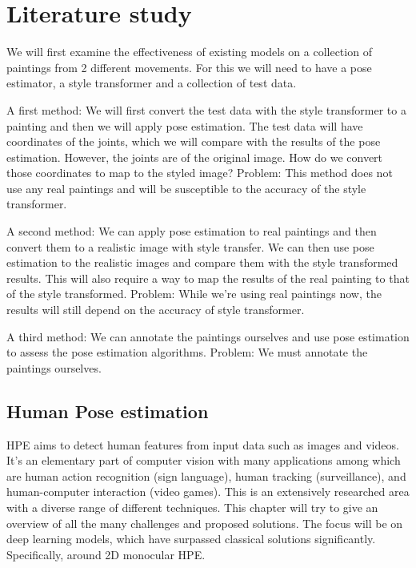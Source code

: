 \chapter{Literature study}
\label{chap:rel_work}

We will first examine the effectiveness of existing models on a collection of paintings from 2 different movements.
For this we will need to have a pose estimator, a style transformer and a collection of test data. 

A first method: We will first convert the test data with the style transformer to a painting and then we will apply pose estimation.
The test data will have coordinates of the joints, which we will compare with the results of the pose estimation.
However, the joints are of the original image. How do we convert those coordinates to map to the styled image? 
Problem: This method does not use any real paintings and will be susceptible to the accuracy of the style transformer.  

A second method: We can apply pose estimation to real paintings and then convert them to a realistic image with style transfer.
We can then use pose estimation to the realistic images and compare them with the style transformed results.
This will also require a way to map the results of the real painting to that of the style transformed. 
Problem: While we’re using real paintings now, the results will still depend on the accuracy of style transformer. 

A third method: We can annotate the paintings ourselves and use pose estimation to assess the pose estimation algorithms. 
Problem: We must annotate the paintings ourselves. 

\section{Human Pose estimation}
\label{sec:hpe}

\gls{HPE} aims to detect human features from input data such as images and videos.
It's an elementary part of computer vision with many applications among which are human action recognition (sign language), human tracking (surveillance), and human-computer interaction (video games).
This is an extensively researched area with a diverse range of different techniques.
This chapter will try to give an overview of all the many challenges and proposed solutions.
The focus will be on deep learning models, which have surpassed classical solutions significantly.
Specifically, around 2D monocular \gls{HPE}. \cite{Munea2020}\cite{Zheng2012}\cite{Liu2104}\cite{chen2022}

